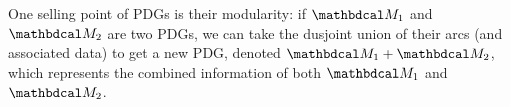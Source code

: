 \documentclass[twoside]{article}
\begin{document}
One selling point of PDGs is their modularity: if $\dg M_1$ and $\dg M_2$ are two PDGs, we can take the dusjoint union of their arcs (and associated data) to get a new PDG, denoted $\dg M_1 + \dg M_2$,
which represents the combined information of both $\dg M_1$ and $\dg M_2$.


\end{document}
